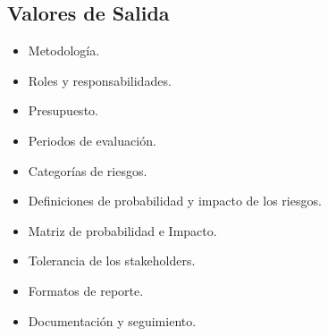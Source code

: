 \subsection{Valores de Salida}
\begin{itemize}
    \item Metodología.
    \item Roles y responsabilidades.
    \item Presupuesto.
    \item Periodos de evaluación.
    \item Categorías de riesgos.
    \item Definiciones de probabilidad y impacto de los riesgos.
    \item Matriz de probabilidad e Impacto.
    \item Tolerancia de los stakeholders.
    \item Formatos de reporte.
    \item Documentación y seguimiento.
\end{itemize}
